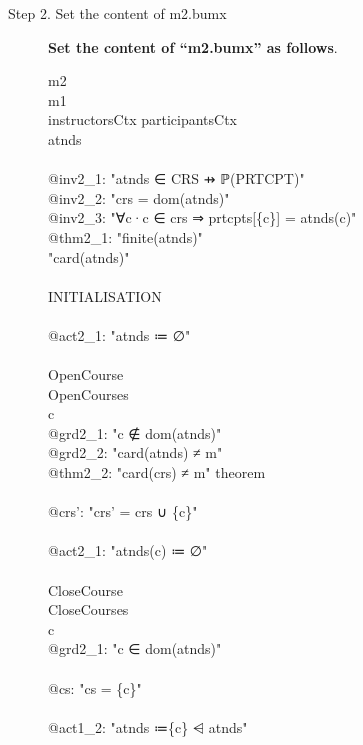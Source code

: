 \begin{description}
\item[Step 2. Set the content of m2.bumx] \textbf{Set the content of ``m2.bumx'' as follows}.
  \begin{center}
    \begin{Bcode}
      \ifplastex
      \Bmachine{} m2\\
      \Brefines{} m1\\
      \Bsees{} instructorsCtx participantsCtx\\
      \Bvariables{} atnds\\
      \Binvariants\\
      @inv2_1: "atnds ∈ CRS ⇸ ℙ(PRTCPT)"\\
      @inv2_2: "crs = dom(atnds)"\\
      @inv2_3: "∀c·c ∈ crs ⇒ prtcpts[\{c\}] = atnds(c)"\\
      @thm2_1: "finite(atnds)" \Btheorem\\
      \Bvariant{} "card(atnds)"\\
      \Bevents\\
      INITIALISATION\\
      \Bbegin\\
      @act2_1: "atnds ≔ ∅"\\
      \Bend\\
      OpenCourse\\
      \Brefines{} OpenCourses\\
      \Bany{} c \Bwhere\\
      @grd2_1: "c ∉ dom(atnds)"\\
      @grd2_2: "card(atnds) ≠ m" \\
      @thm2_2: "card(crs) ≠ m" theorem\\
      \Bwith\\
      @crs': "crs' = crs ∪ \{c\}"\\
      \Bthen\\
      @act2_1: "atnds(c) ≔ ∅"\\
      \Bend\\
      CloseCourse \Bconvergent\\
      \Brefines{} CloseCourses\\
      \Bany{} c \Bwhere\\
      @grd2_1: "c ∈ dom(atnds)"\\
      \Bwith\\
      @cs: "cs = \{c\}"\\
      \Bthen\\
      @act1_2: "atnds ≔\{c\} ⩤ atnds"\\

\end{Bcode}
\end{center}
\end{description}
